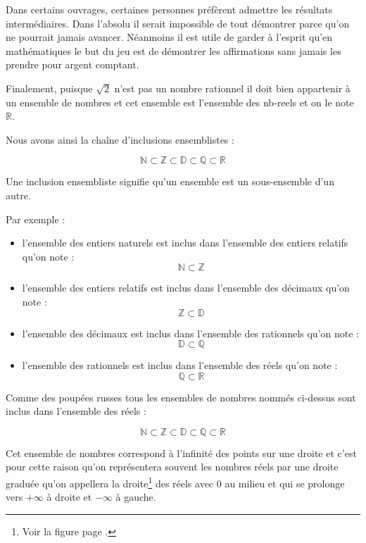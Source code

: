 \documentclass[a4paper,11pt]{book}
\begin{document}
Dans certains ouvrages, certaines personnes préfèrent admettre les
résultats intermédiaires. Dans l'absolu il serait impossible de
tout démontrer parce qu'on ne pourrait jamais
avancer. Néanmoins il est utile de garder à l'esprit qu'en
mathématiques le but du jeu est de démontrer les affirmations sans
jamais les prendre pour argent comptant.


Finalement, puisque \(\sqrt{2}\) n'est pas un nombre
rationnel il doit bien appartenir à un
ensemble de nombres et cet ensemble est
l'ensemble des \gls{nb-reels} et on
le note \(\mathbb{R}\).



Nous avons ainsi la chaîne d'inclusions ensemblistes :

\[\mathbb{N}\subset\mathbb{Z}\subset\mathbb{D}\subset\mathbb{Q}\subset\mathbb{R}\]

Une inclusion ensembliste signifie qu'un
ensemble est un sous-ensemble d'un autre.

Par exemple :
\begin{itemize}
\item l'ensemble des entiers naturels est inclus
dans l'ensemble des entiers relatifs qu'on note :
\[\mathbb{N}\subset\mathbb{Z}\]
\item l'ensemble des entiers relatifs est inclus dans l'ensemble des
décimaux qu'on note : \[\mathbb{Z}\subset\mathbb{D}\]
\item l'ensemble des décimaux est inclus dans l'ensemble des
rationnels qu'on note : \[\mathbb{D}\subset\mathbb{Q}\]
\item l'ensemble des rationnels est inclus dans l'ensemble des
réels qu'on note : \[\mathbb{Q}\subset\mathbb{R}\]
\end{itemize}

Comme des poupées russes tous les ensembles de nombres nommés
ci-dessus sont inclus dans l'ensemble des réels :

\[\mathbb{N}\subset\mathbb{Z}\subset\mathbb{D}\subset\mathbb{Q}\subset\mathbb{R}\]

Cet ensemble de nombres correspond à
l'infinité des points sur une droite et c'est pour cette raison qu'on
représentera souvent les nombres réels par une
droite graduée qu'on appellera la
droite\footnote{Voir la figure page \pageref{page:real-line}.} des réels avec 0 au milieu et
qui se prolonge vers \(+\infty\) à droite et \(-\infty\) à gauche.
\end{document}
